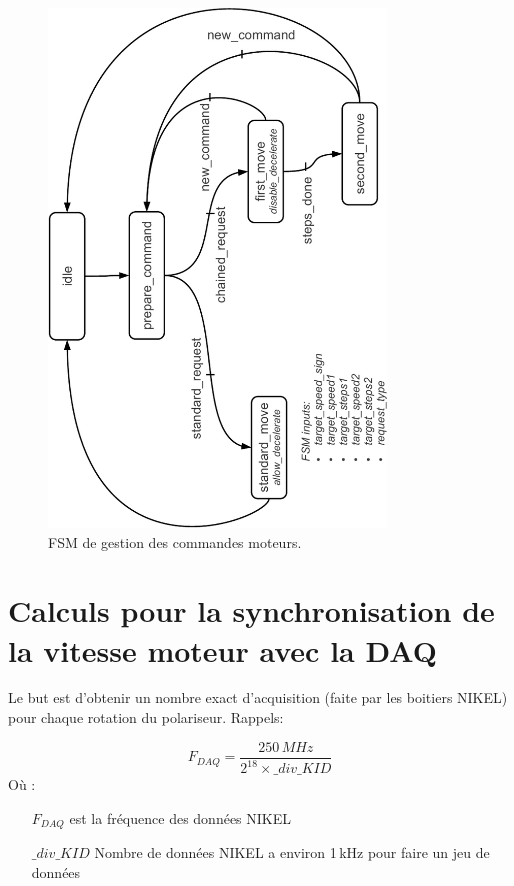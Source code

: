 \documentclass[11pt,a4paper,oneside,onecolumn]{article}
\begin{document}
\begin{figure}[th]
\begin{center}
\includegraphics[angle=-90,width=0.8\textwidth]{./figs/MPPSYNC_command_FSM}
\caption{FSM de gestion des commandes moteurs.}
\label{MPPSYNC_command_FSM}
\end{center}
\end{figure}

\section{Calculs pour la synchronisation de la vitesse moteur avec la DAQ}
Le but est d'obtenir un nombre exact d'acquisition (faite par les boitiers NIKEL) pour chaque rotation du polariseur. Rappels:

\begin{equation}
 F_{DAQ}=\dfrac{250\,MHz}{2^{18} \times \_div\_KID}
\end{equation}
Où :
\begin{itemize}
 \item [$F_{DAQ}$] est la fréquence des données NIKEL
 \item [$\_div\_KID$] Nombre de données NIKEL a environ 1\,kHz pour faire un jeu de données
\end{itemize}
\end{document}
